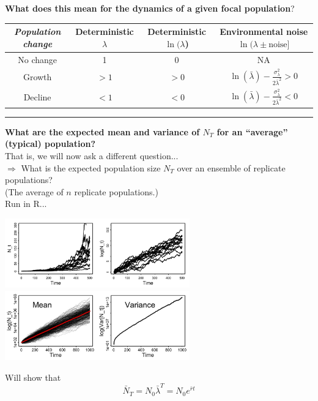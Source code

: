 \documentclass{article}
\newcommand{\note}[1]{\colorbox{gray!20}{#1}}
\newcommand{\ind}{\-\hspace{1cm}}
\begin{document}
\textbf{What does this mean for the dynamics of a given focal population}?
\begin{center}
\begin{tabular}{|c|c|c|c|}
\hline \rule[-2ex]{0pt}{5.5ex} \emph{Population change} &  Deterministic $\lambda$ & Deterministic $\ln(\lambda$) &  Environmental noise $\ln(\lambda \pm \text{noise}]$\\ 
\hline \rule[-2ex]{0pt}{5.5ex} No change & 1 & 0 & NA \\
\hline \rule[-2ex]{0pt}{5.5ex} Growth  & $>1$ & $>0$  & $\ln(\bar{\lambda})-\frac{\sigma_\lambda^2}{2\bar{\lambda}^2}>0$  \\ 
\hline \rule[-2ex]{0pt}{5.5ex} Decline & $<1$ & $<0$  & $\ln(\bar{\lambda})-\frac{\sigma_\lambda^2}{2\bar{\lambda}^2}<0$  \\ 
\hline 
\end{tabular}
\end{center} 

\rule[0.5ex]{\linewidth}{1pt}

\textbf{What are the expected mean and variance of $N_T$ for an ``average'' (typical) population?}\\
That is, we will now ask a different question...\\
\ind $\Rightarrow$ What is the expected population size $N_T$ over an ensemble of replicate populations?\\
\ind (The average of $n$ replicate populations.)\\
\note{Run in R...}
\begin{center}
 \includegraphics[width=8cm]{figs/image1}\\
 \includegraphics[width=8cm]{figs/image2}
\end{center}

Will show that
\begin{equation*}
	\bar{N}_T = N_0 \bar{\lambda}^T = N_0 e^{\bar{r}t}
\end{equation*}
\end{document}
